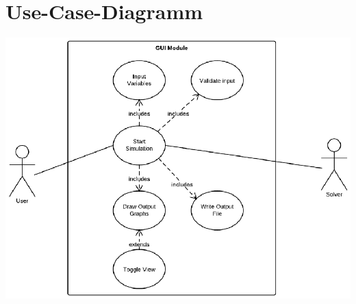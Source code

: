 \section{Use-Case-Diagramm}
\label{sec:3.4}
\includegraphics[width=6in,keepaspectratio=true]{figures/UseCaseTippeTop.eps}

